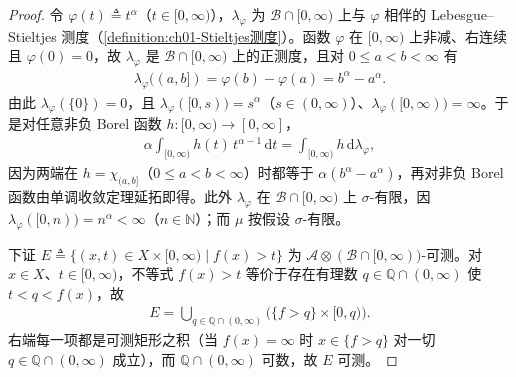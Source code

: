 \documentclass[../../main.tex]{subfiles}%
\begin{document}
\begin{proof}
令 $\varphi(t)\triangleq t^\alpha$（$t\in[0,\infty)$），$\lambda_\varphi$ 为 $\mathscr B\cap[0,\infty)$ 上与 $\varphi$ 相伴的 Lebesgue--Stieltjes 测度（\cref{definition:ch01-Stieltjes测度}）。函数 $\varphi$ 在 $[0,\infty)$ 上非减、右连续且 $\varphi(0)=0$，故 $\lambda_\varphi$ 是 $\mathscr B\cap[0,\infty)$ 上的正测度，且对 $0\leqslant a<b<\infty$ 有
\begin{align*}
\lambda_\varphi((a,b])=\varphi(b)-\varphi(a)=b^\alpha-a^\alpha.
\end{align*}
由此 $\lambda_\varphi(\{0\})=0$，且 $\lambda_\varphi([0,s))=s^\alpha$（$s\in(0,\infty)$）、$\lambda_\varphi([0,\infty))=\infty$。于是对任意非负 Borel 函数 $h:[0,\infty)\to[0,\infty]$，
\begin{align*}
\alpha\int_{[0,\infty)}h(t)\,t^{\alpha-1}\,\mathrm{d}t=\int_{[0,\infty)}h\,\mathrm{d}\lambda_\varphi,
\end{align*}
因为两端在 $h=\chi_{(a,b]}$（$0\leqslant a<b<\infty$）时都等于 $\alpha(b^\alpha-a^\alpha)$，再对非负 Borel 函数由单调收敛定理延拓即得。此外 $\lambda_\varphi$ 在 $\mathscr B\cap[0,\infty)$ 上 $\sigma$-有限，因 $\lambda_\varphi([0,n))=n^\alpha<\infty$（$n\in\mathbb N$）；而 $\mu$ 按假设 $\sigma$-有限。

下证 $E\triangleq\{(x,t)\in X\times[0,\infty)\mid f(x)>t\}$ 为 $\mathscr A\otimes(\mathscr B\cap[0,\infty))$-可测。对 $x\in X$、$t\in[0,\infty)$，不等式 $f(x)>t$ 等价于存在有理数 $q\in\mathbb Q\cap(0,\infty)$ 使 $t<q<f(x)$，故
\begin{align*}
E=\bigcup_{q\in\mathbb Q\cap(0,\infty)}\bigl(\{f>q\}\times[0,q)\bigr).
\end{align*}
右端每一项都是可测矩形之积（当 $f(x)=\infty$ 时 $x\in\{f>q\}$ 对一切 $q\in\mathbb Q\cap(0,\infty)$ 成立），而 $\mathbb Q\cap(0,\infty)$ 可数，故 $E$ 可测。


\end{proof}
\end{document}
